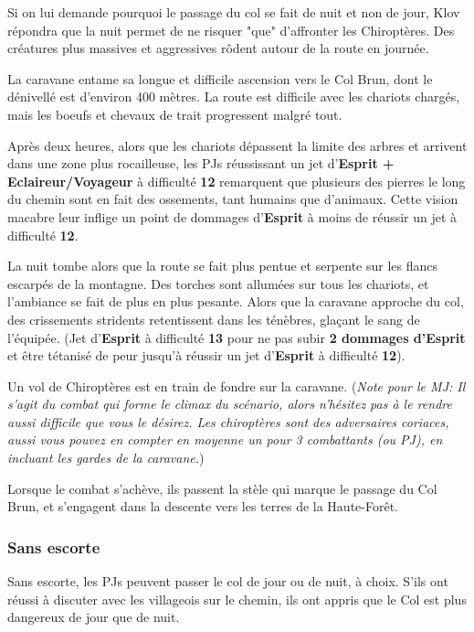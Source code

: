 \documentclass[10pt,twoside,twocolumn,openany,bg=print,justified]{dndbook}
\begin{document}
Si on lui demande pourquoi le passage du col se fait de nuit et non de jour, Klov répondra que la nuit permet de ne risquer "que" d'affronter les Chiroptères. Des créatures plus massives et aggressives rôdent autour de la route en journée.

La caravane entame sa longue et difficile ascension vers le Col Brun, dont le dénivellé est d'environ 400 mètres. La route est difficile avec les chariots chargés, mais les boeufs et chevaux de trait progressent malgré tout.

Après deux heures, alors que les chariots dépassent la limite des arbres et arrivent dans une zone plus rocailleuse, les PJs réussissant un jet d'\textbf{Esprit + Eclaireur/Voyageur} à difficulté \textbf{12} remarquent que plusieurs des pierres le long du chemin sont en fait des ossements, tant humains que d'animaux. Cette vision macabre leur inflige un point de dommages d'\textbf{Esprit} à moins de réussir un jet à difficulté \textbf{12}.

La nuit tombe alors que la route se fait plus pentue et serpente sur les flancs escarpés de la montagne. Des torches sont allumées sur tous les chariots, et l'ambiance se fait de plus en plus pesante. Alors que la caravane approche du col, des crissements stridents retentissent dans les ténèbres, glaçant le sang de l'équipée. (Jet d'\textbf{Esprit} à difficulté \textbf{13} pour ne pas subir \textbf{2 dommages d'Esprit} et être tétanisé de peur jusqu'à réussir un jet d'\textbf{Esprit} à difficulté \textbf{12}).

Un vol de Chiroptères est en train de fondre sur la caravane. (\textit{Note pour le MJ: Il s'agit du combat qui forme le climax du scénario, alors n'hésitez pas à le rendre aussi difficile que vous le désirez. Les chiroptères sont des adversaires coriaces, aussi vous pouvez en compter en moyenne un pour 3 combattants (ou PJ), en incluant les gardes de la caravane.})

Lorsque le combat s'achève, ils passent la stèle qui marque le passage du Col Brun, et s'engagent dans la descente vers les terres de la Haute-Forêt. 

\subsubsection*{Sans escorte}

Sans escorte, les PJs peuvent passer le col de jour ou de nuit, à choix. S'ils ont réussi à discuter avec les villageois sur le chemin, ils ont appris que le Col est plus dangereux de jour que de nuit. 
\end{document}
